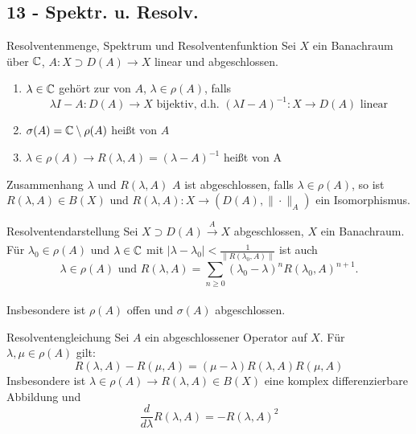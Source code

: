 \subsection*{13 - Spektr. u. Resolv.}

\begin{karte}{Resolventenmenge, Spektrum und Resolventenfunktion}
	Sei $X$ ein Banachraum über $\mathbb{C}$, $A \colon X \supset D(A) \rightarrow X$ linear und abgeschlossen.
	\begin{enumerate}[label=\alph*\upshape)]
		\item $\lambda \in \mathbb{C}$ gehört zur  von $A$, $\lambda \in \rho(A)$, falls
			\[ \lambda I - A \colon D(A) \rightarrow X \text{ bijektiv, d.h. } (\lambda I - A)^{-1} \colon X \rightarrow D(A) \text{ linear} \]
		\item $\sigma(A) = \mathbb{C} \setminus \rho(A)$ hei{\ss}t  von $A$
		\item $\lambda \in \rho(A) \rightarrow R(\lambda, A) = (\lambda - A)^{-1}$ hei{\ss}t  von A
	\end{enumerate}	
\end{karte}


\begin{karte}{Zusammenhang $\lambda$ und $R(\lambda, A)$}
	$A$ ist abgeschlossen, falls $\lambda \in \rho(A)$, so ist $R(\lambda, A) \in B(X)$ und $R(\lambda, A) \colon X \rightarrow (D(A), \| \cdot \|_{A})$ ein Isomorphismus.
\end{karte}


\begin{karte}{Resolventendarstellung}
	Sei $X \supset D(A) \xrightarrow[]{A} X$ abgeschlossen, $X$ ein Banachraum. \\
	Für $\lambda_{0} \in \rho(A)$ und $\lambda \in \mathbb{C}$ mit $|\lambda - \lambda_{0}| < \frac{1}{\| R(\lambda_{0}, A) \|}$ ist auch \\
		\[ \lambda \in \rho(A) \text{ und } R(\lambda, A) = \sum_{n \geq 0} (\lambda_{0} - \lambda)^{n} R(\lambda_{0}, A)^{n + 1}. \] \\
	Insbesondere ist $\rho(A)$ offen und $\sigma(A)$ abgeschlossen.
\end{karte}

\begin{karte}{Resolventengleichung}
	Sei $A$ ein abgeschlossener Operator auf $X$. Für $\lambda, \mu \in \rho(A)$ gilt:
		\[ R(\lambda, A) - R(\mu, A) = (\mu - \lambda) R(\lambda, A) R(\mu, A) \]
	Insbesondere ist $\lambda \in \rho(A) \rightarrow R(\lambda, A) \in B(X)$ eine komplex differenzierbare Abbildung und 
		\[ \frac{d}{d \lambda} R(\lambda, A) = - R(\lambda, A)^{2} \]
\end{karte}

